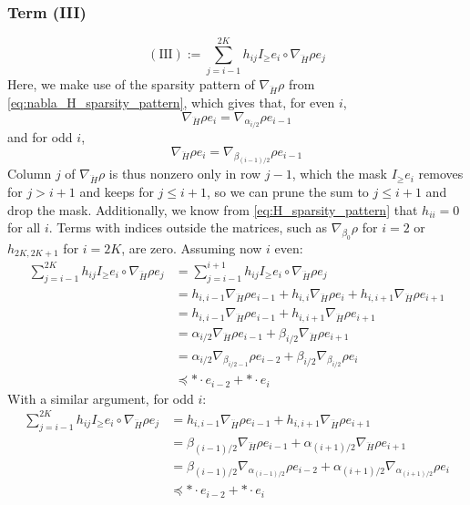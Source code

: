 \documentclass[a4paper,12pt]{article}
\theoremstyle{definition}
\begin{document}
\subsubsection{Term (III)}
$$(\text{III}) := \sum_{j=i-1}^{2K} h_{ij} I_\geq e_i \circ \nabla_{\dddot{H}} \rho e_j$$
Here, we make use of the sparsity pattern of $\nabla_{\dddot{H}} \rho$ from \eqref{eq:nabla_H_sparsity_pattern}, which gives that, for even $i$,
$$\nabla_{\dddot{H}} \rho e_i = \nabla_{\alpha_{i/2}} \rho e_{i-1}$$
and for odd $i$, 
$$\nabla_{\dddot{H}} \rho e_i = \nabla_{\beta_{(i-1)/2}} \rho e_{i-1}$$
Column $j$ of $\nabla_{\dddot{H}} \rho$ is thus nonzero only in row $j - 1$, which the mask $I_\geq e_i$ removes for $j > i + 1$ and keeps for $j \leq i + 1$, so we can prune the sum to $j \leq i + 1$ and drop the mask. Additionally, we know from \eqref{eq:H_sparsity_pattern} that $h_{ii} = 0$ for all $i$. Terms with indices outside the matrices, such as $\nabla_{\beta_0}\rho$ for $i = 2$ or $h_{2K, 2K+1}$ for $i = 2K$, are zero.
Assuming now $i$ even:
\begin{align*}
    \sum_{j=i-1}^{2K} h_{ij} I_\geq e_i \circ \nabla_{\dddot{H}} \rho e_j  
    &= 
    \sum_{j=i-1}^{i+1} h_{ij} I_\geq e_i \circ \nabla_{\dddot{H}} \rho e_j 
    \\ &= h_{i,i-1} \nabla_{\dddot{H}} \rho e_{i-1} + h_{i,i} \nabla_{\dddot{H}} \rho e_i + h_{i,i+1} \nabla_{\dddot{H}} \rho e_{i+1}
    \\ &= h_{i,i-1} \nabla_{\dddot{H}} \rho e_{i-1} + h_{i,i+1} \nabla_{\dddot{H}} \rho e_{i+1}
    \\ &= \alpha_{i/2} \nabla_{\dddot{H}} \rho e_{i-1} + \beta_{i/2} \nabla_{\dddot{H}} \rho e_{i+1}
    \\ &= \alpha_{i/2} \nabla_{\beta_{i/2 - 1}}\rho e_{i-2} + \beta_{i/2} \nabla_{\beta_{i/2}}\rho e_{i}
    \\ &\preceq * \cdot e_{i-2} + * \cdot e_{i}
\end{align*}
With a similar argument, for odd $i$:
\begin{align*}
    \sum_{j=i-1}^{2K} h_{ij} I_\geq e_i \circ \nabla_{\dddot{H}} \rho e_j  
    &= h_{i,i-1} \nabla_{\dddot{H}} \rho e_{i-1} + h_{i,i+1} \nabla_{\dddot{H}} \rho e_{i+1}
    \\ &= \beta_{(i-1)/2} \nabla_{\dddot{H}} \rho e_{i-1} + \alpha_{(i+1)/2} \nabla_{\dddot{H}} \rho e_{i+1}
    \\ &= \beta_{(i-1)/2} \nabla_{\alpha_{(i-1)/2}}\rho e_{i-2} + \alpha_{(i+1)/2} \nabla_{\alpha_{(i+1)/2}}\rho e_{i}
    \\ &\preceq * \cdot e_{i-2} + * \cdot e_{i}
\end{align*}
\end{document}
